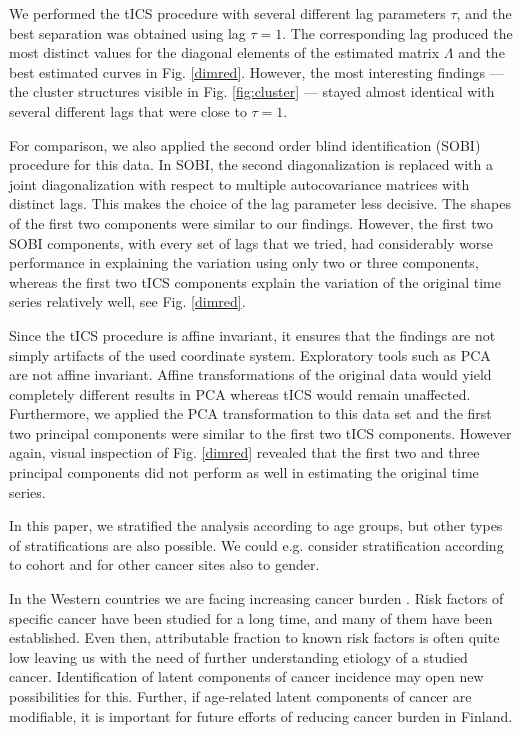 \documentclass{llncs}
\begin{document}
We performed the tICS procedure with several different lag parameters $\tau$, and the best separation was obtained using lag $\tau=1$. The corresponding lag produced the most distinct values for the diagonal elements of the estimated matrix $\Lambda$ and the best estimated curves in Fig. \ref{dimred}. However, the most interesting findings --- the cluster structures visible in Fig. \ref{fig:cluster} --- stayed almost identical with several different lags that were close to $\tau=1$. 

For comparison, we also applied the second order blind identification (SOBI) \cite{belouchrani1997} procedure for this data. In SOBI, the second diagonalization is replaced with a joint diagonalization with respect to multiple autocovariance matrices with distinct lags. This makes the choice of the lag parameter less decisive. The shapes of the first two components were similar to our findings. However, the first two SOBI components, with every set of lags that we tried, had considerably worse performance in explaining the variation using only two or three components, whereas the first two tICS components explain the variation of the original time series relatively well, see Fig. \ref{dimred}.



Since the  tICS procedure is affine invariant, it ensures that the findings are not simply artifacts of the used coordinate system. Exploratory tools such as PCA are not affine invariant.
Affine transformations of the original data would yield completely different results in PCA whereas tICS would remain unaffected. Furthermore, we applied the PCA transformation to this data set and the first two principal components were similar to the first two tICS components. However again, visual inspection of Fig. \ref{dimred} revealed that the first two and three principal components did not perform as well in estimating the original time series. 

In this paper, we  stratified the analysis according to age groups, but other types of stratifications are also possible. We could e.g. consider stratification according to cohort and for other cancer sites also to gender.

In the Western countries we are facing increasing cancer burden \cite{parkin2011}. Risk factors of  specific cancer have been studied for a long time, and many of them have been established. Even then, attributable fraction to known risk factors is often quite low leaving us with the need of further understanding etiology of a studied cancer. Identification of latent components of cancer incidence may open new possibilities for this. Further, if age-related latent components of cancer are modifiable, it is important for future efforts of reducing cancer burden in Finland. 







\end{document}

